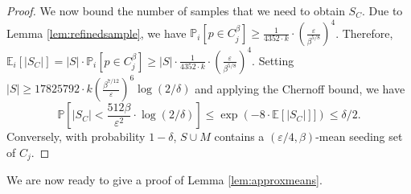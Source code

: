 \documentclass[11pt]{article}
\begin{document}
\begin{proof}
We now bound the number of samples that we need to obtain $S_C$.
Due to Lemma \ref{lem:refinedsample}, we have $\mathbb{P}_i[p\in C_j^\beta]\geq \frac{1}{4352\cdot k}\cdot \left(\frac{\varepsilon}{\beta^{5/8}}\right)^4$. 
Therefore, $\mathbb{E}_i[|S_C|] = |S| \cdot \mathbb{P}_i[p\in C_j^\beta] \geq |S|\cdot \frac{1}{4352\cdot k}\cdot \left(\frac{\varepsilon}{\beta^{5/8}}\right)^4$.
Setting $|S|\geq 17825792 \cdot k\left(\frac{\beta^{7/12}}{\varepsilon}\right)^6 \log(2/\delta)$ and applying the Chernoff bound, we have
$$\mathbb{P}\left[|S_C|< \frac{512\beta}{\varepsilon^2}\cdot\log(2/\delta)\right] \leq \exp(-8 \cdot \mathbb{E}[|S_C|]]) \leq \delta/2.$$
Conversely, with probability $1-\delta$, $S\cup M$ contains a $(\varepsilon/4,\beta)$-mean seeding set of $C_j$.
\end{proof}


We are now ready to give a proof of Lemma \ref{lem:approxmeans}.
\end{document}
